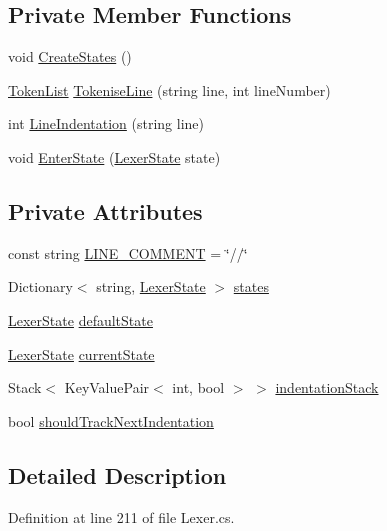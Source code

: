 \subsection*{Private Member Functions}
\begin{DoxyCompactItemize}
\item 
void \hyperlink{a00121_a646081a52b241abaafe5e0cfaeafd751}{Create\-States} ()
\item 
\hyperlink{a00169}{Token\-List} \hyperlink{a00121_a20b63f6ef434f6a40fd388f262f03fa8}{Tokenise\-Line} (string line, int line\-Number)
\item 
int \hyperlink{a00121_a4079b10b099e5d85f5482f9e7eac4179}{Line\-Indentation} (string line)
\item 
void \hyperlink{a00121_ad3ef08f822b310d9864774b057b96995}{Enter\-State} (\hyperlink{a00122}{Lexer\-State} state)
\end{DoxyCompactItemize}
\subsection*{Private Attributes}
\begin{DoxyCompactItemize}
\item 
const string \hyperlink{a00121_a29c457125cc4876f8571f5d9afa372e2}{L\-I\-N\-E\-\_\-\-C\-O\-M\-M\-E\-N\-T} = \char`\"{}//\char`\"{}
\item 
Dictionary$<$ string, \hyperlink{a00122}{Lexer\-State} $>$ \hyperlink{a00121_a2c65c0ba90f973e459583badefef216a}{states}
\item 
\hyperlink{a00122}{Lexer\-State} \hyperlink{a00121_a16b5dbf27a377cde5e8ba0eaa05b5710}{default\-State}
\item 
\hyperlink{a00122}{Lexer\-State} \hyperlink{a00121_ac90b7dce8103425a148f9e8588f14137}{current\-State}
\item 
Stack$<$ Key\-Value\-Pair$<$ int, bool $>$ $>$ \hyperlink{a00121_a6631a1b1a9109258ab18927e7587ff9b}{indentation\-Stack}
\item 
bool \hyperlink{a00121_ac670aac2245cbd4694dfbd5b69313218}{should\-Track\-Next\-Indentation}
\end{DoxyCompactItemize}


\subsection{Detailed Description}


Definition at line 211 of file Lexer.\-cs.



